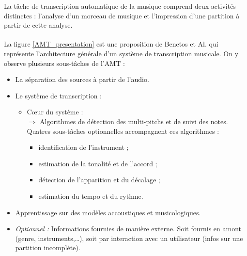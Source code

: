 La tâche de transcription automatique de la musique comprend deux activités distinctes : l'analyse d'un morceau de musique et l'impression d'une partition à partir de cette analyse.\\\\
La figure \ref{AMT_presentation} est une proposition de Benetos et Al. \cite{article1} qui représente l'architecture générale d'un système de transcription musicale. On y observe plusieurs sous-tâches de l’AMT :
\begin{itemize}
	\item La séparation des sources à partir de l’audio.
	\item Le système de transcription :
	\begin{itemize}
		\item Cœur du système :\\
		$\Rightarrow$ Algorithmes de détection des multi-pitchs et de suivi des \tab notes.\\
		Quatres sous-tâches optionnelles accompagnent ces algorithmes :
		\begin{itemize}
			\item identification de l'instrument ;
			\item estimation de la tonalité et de l'accord ;
			\item détection de l'apparition et du décalage ;
			\item estimation du tempo et du rythme.
		\end{itemize}
	\end{itemize}
	\item Apprentissage sur des modèles accoustiques et musicologiques.
	\item \textit{Optionnel :} Informations fournies de manière externe. Soit fournis en amont (genre, instruments,…), soit par interaction avec un utilisateur (infos sur une partition incomplète).
\end{itemize}

